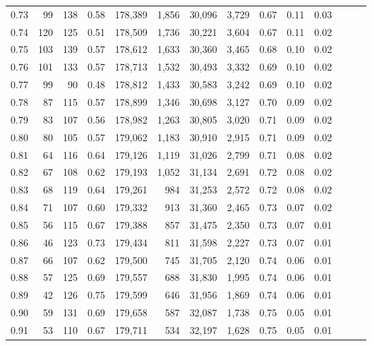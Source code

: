 \begin{tabular}{rrrrrrrrrrrrrr}
0.73 &      99 &  138 &  0.58 &  178,389 &    1,856 &  30,096 &   3,729 &  0.67 &  0.11 &      0.03 \\
0.74 &     120 &  125 &  0.51 &  178,509 &    1,736 &  30,221 &   3,604 &  0.67 &  0.11 &      0.02 \\
0.75 &     103 &  139 &  0.57 &  178,612 &    1,633 &  30,360 &   3,465 &  0.68 &  0.10 &      0.02 \\
0.76 &     101 &  133 &  0.57 &  178,713 &    1,532 &  30,493 &   3,332 &  0.69 &  0.10 &      0.02 \\
0.77 &      99 &   90 &  0.48 &  178,812 &    1,433 &  30,583 &   3,242 &  0.69 &  0.10 &      0.02 \\
0.78 &      87 &  115 &  0.57 &  178,899 &    1,346 &  30,698 &   3,127 &  0.70 &  0.09 &      0.02 \\
0.79 &      83 &  107 &  0.56 &  178,982 &    1,263 &  30,805 &   3,020 &  0.71 &  0.09 &      0.02 \\
0.80 &      80 &  105 &  0.57 &  179,062 &    1,183 &  30,910 &   2,915 &  0.71 &  0.09 &      0.02 \\
0.81 &      64 &  116 &  0.64 &  179,126 &    1,119 &  31,026 &   2,799 &  0.71 &  0.08 &      0.02 \\
0.82 &      67 &  108 &  0.62 &  179,193 &    1,052 &  31,134 &   2,691 &  0.72 &  0.08 &      0.02 \\
0.83 &      68 &  119 &  0.64 &  179,261 &      984 &  31,253 &   2,572 &  0.72 &  0.08 &      0.02 \\
0.84 &      71 &  107 &  0.60 &  179,332 &      913 &  31,360 &   2,465 &  0.73 &  0.07 &      0.02 \\
0.85 &      56 &  115 &  0.67 &  179,388 &      857 &  31,475 &   2,350 &  0.73 &  0.07 &      0.01 \\
0.86 &      46 &  123 &  0.73 &  179,434 &      811 &  31,598 &   2,227 &  0.73 &  0.07 &      0.01 \\
0.87 &      66 &  107 &  0.62 &  179,500 &      745 &  31,705 &   2,120 &  0.74 &  0.06 &      0.01 \\
0.88 &      57 &  125 &  0.69 &  179,557 &      688 &  31,830 &   1,995 &  0.74 &  0.06 &      0.01 \\
0.89 &      42 &  126 &  0.75 &  179,599 &      646 &  31,956 &   1,869 &  0.74 &  0.06 &      0.01 \\
0.90 &      59 &  131 &  0.69 &  179,658 &      587 &  32,087 &   1,738 &  0.75 &  0.05 &      0.01 \\
0.91 &      53 &  110 &  0.67 &  179,711 &      534 &  32,197 &   1,628 &  0.75 &  0.05 &      0.01 \\

\end{tabular}
